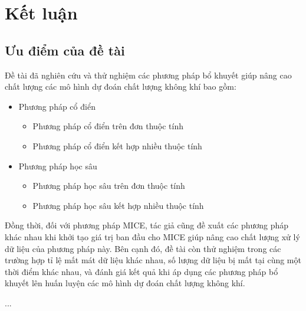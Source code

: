 \chapter{Kết luận}
\section{Ưu điểm của đề tài}
Đề tài đã nghiên cứu và thử nghiệm các phương pháp bổ khuyết giúp nâng cao chất lượng các mô hình dự đoán chất lượng không khí bao gồm:
\begin{itemize}
    \item Phương pháp cổ điển
    \begin{itemize}
        \item Phương pháp cổ điển trên đơn thuộc tính
        \item Phương pháp cổ điển kết hợp nhiều thuộc tính
    \end{itemize}
    \item Phương pháp học sâu
    \begin{itemize}
        \item Phương pháp học sâu trên đơn thuộc tính
        \item Phương pháp học sâu kết hợp nhiều thuộc tính
    \end{itemize}
\end{itemize}

Đồng thời, đối với phương pháp MICE, tác giả cũng đề xuất các phương pháp khác nhau khi khởi tạo giá trị ban đầu cho MICE giúp nâng cao chất lượng xử lý dữ liệu của phương pháp này. Bên cạnh đó, đề tài còn thử nghiệm trong các trường hợp tỉ lệ mất mát dữ liệu khác nhau, số lượng dữ liệu bị mất tại cùng một thời điểm khác nhau, và đánh giá kết quả khi áp dụng các phương pháp bổ khuyết lên huấn luyện các mô hình dự đoán chất lượng không khí.

...